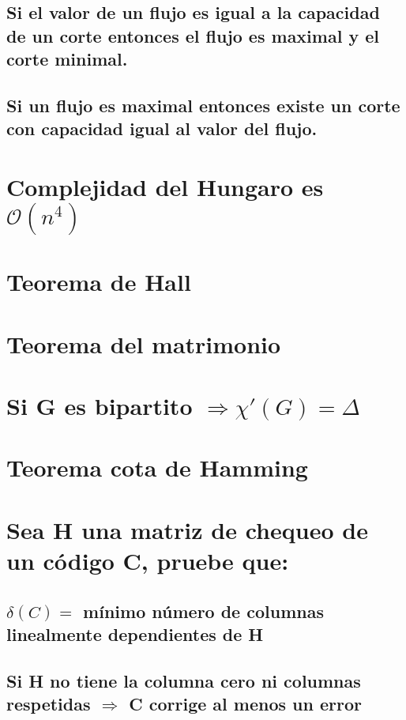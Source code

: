 \documentclass[12pt,a4paper]{report}
\begin{document}
		\subsection{Si el valor de un flujo es igual a la capacidad de un corte entonces el flujo es maximal y el corte minimal.}
		
		\subsection{Si un flujo es maximal entonces existe un corte con capacidad igual al valor del flujo.}
	
	
	\section{Complejidad del Hungaro es $\mathcal{O}(n^{4})$}
	
	
	\section{Teorema de Hall}
	
	
	\section{Teorema del matrimonio}
	
	
	\section{Si G es bipartito $\Rightarrow \chi '(G) = \Delta $}

	
	\section{Teorema cota de Hamming}
	
	
	\section{Sea H una matriz de chequeo de un código C, pruebe que:}
	
		\subsection{$\delta (C) =$ mínimo número de columnas linealmente dependientes de H}
		
		\subsection{Si H no tiene la columna cero ni columnas respetidas $\Rightarrow$ C corrige al menos un error}
\end{document}

